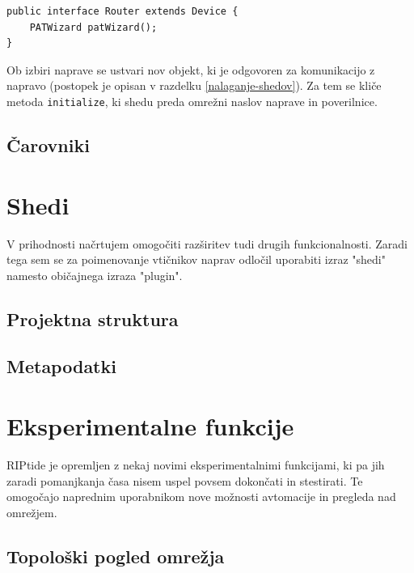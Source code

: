 \documentclass[12pt]{article}
\begin{document}
\begin{lstlisting}
public interface Router extends Device {
	PATWizard patWizard();
}
\end{lstlisting}

Ob izbiri naprave se ustvari nov objekt, ki je odgovoren za
komunikacijo z napravo (postopek je opisan v razdelku
\ref{nalaganje-shedov}). Za tem se kliče metoda \verb|initialize|, ki
shedu preda omrežni naslov naprave in poverilnice.

\subsection{Čarovniki}
\newpage

\section{Shedi}
V prihodnosti načrtujem omogočiti razširitev tudi drugih funkcionalnosti.
Zaradi tega sem se za poimenovanje vtičnikov naprav odločil uporabiti
izraz "shedi" namesto običajnega izraza "plugin".

\subsection{Projektna struktura} \label{projektna-struktura}
\subsection{Metapodatki}
\subsection{}
\newpage

\section{Eksperimentalne funkcije}
RIPtide je opremljen z nekaj novimi eksperimentalnimi funkcijami,
ki pa jih zaradi pomanjkanja časa nisem uspel povsem dokončati in
stestirati. Te omogočajo naprednim uporabnikom nove možnosti avtomacije
in pregleda nad omrežjem.

\subsection{Topološki pogled omrežja}
\newpage
\end{document}
